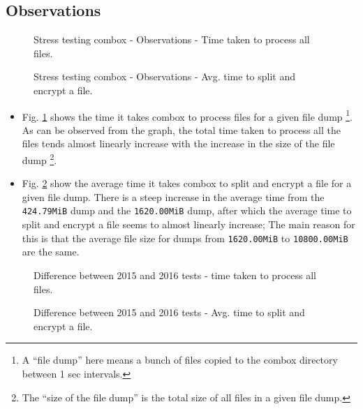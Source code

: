 \subsection{Observations}\label{4-st-o}

\begin{figure}[h]
  \centering 
  \caption{Stress testing combox - Observations - Time taken to
    process all files.}
  \label{fig:4-st-tt}
\end{figure}

\begin{figure}[h]
  \centering 
  \caption{Stress testing combox - Observations - Avg. time to split
    and encrypt a file.}
  \label{fig:4-st-atsae}
\end{figure}


\begin{itemize}
\item Fig. \ref{fig:4-st-tt} shows the time it takes combox to process
  files for a given file dump \footnote{A ``file dump'' here means a
    bunch of files copied to the combox directory between 1 sec
    intervals.}. As can be observed from the graph, the total time
  taken to process all the files tends almost linearly increase with
  the increase in the size of the file dump \footnote{The ``size of
    the file dump'' is the total size of all files in a given file
    dump.}.
\item Fig. \ref{fig:4-st-atsae} show the average time it takes combox
  to split and encrypt a file for a given file dump. There is a steep
  increase in the average time from the \verb+424.79MiB+ dump and the
  \verb+1620.00MiB+ dump, after which the average time to split and
  encrypt a file seems to almost linearly increase; The main reason
  for this is that the average file size for dumps from
  \verb+1620.00MiB+ to \verb+10800.00MiB+ are the same.
\end{itemize}

\begin{figure}[h]
  \centering 
  \caption{Difference between 2015 and 2016 tests - time taken to
    process all files.}
  \label{fig:4-st-tt-diff}
\end{figure}

\begin{figure}[h]
  \centering 
  \caption{Difference between 2015 and 2016 tests - Avg. time to split
    and encrypt a file.}
  \label{fig:4-st-atsae-diff}
\end{figure}

